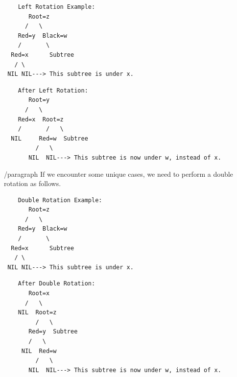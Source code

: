 \documentclass{article}
\begin{document}
\begin{verbatim}
    Left Rotation Example:
       Root=z
      /   \
    Red=y  Black=w
    /       \
  Red=x      Subtree
   / \
 NIL NIL---> This subtree is under x.
\end{verbatim}

\begin{verbatim}
    After Left Rotation:
       Root=y
      /   \
    Red=x  Root=z
    /       /   \
  NIL     Red=w  Subtree
         /   \
       NIL  NIL---> This subtree is now under w, instead of x.
\end{verbatim}


/paragraph{
    If we encounter some unique cases, we need to perform a double rotation as follows.\\
}

\begin{verbatim}
    Double Rotation Example:
       Root=z
      /   \
    Red=y  Black=w
    /       \
  Red=x      Subtree
   / \
 NIL NIL---> This subtree is under x.
\end{verbatim}

\begin{verbatim}
    After Double Rotation:
       Root=x
      /   \
    NIL  Root=z
         /   \
       Red=y  Subtree
       /   \
     NIL  Red=w
         /   \
       NIL  NIL---> This subtree is now under w, instead of x.
\end{verbatim}
\end{document}
